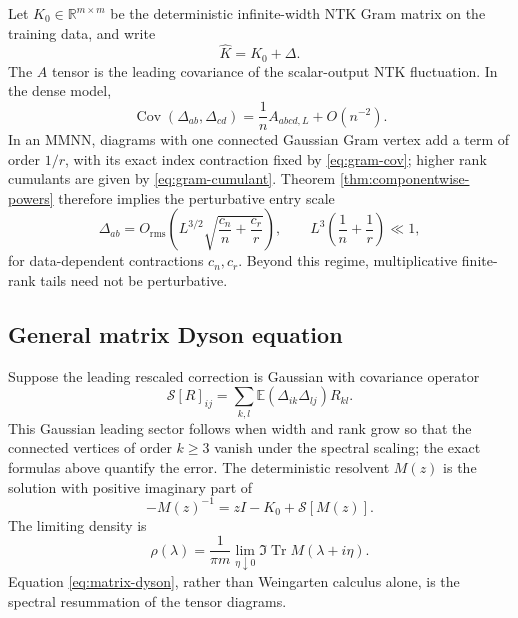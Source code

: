 \documentclass{article}
\newcommand{\E}{\mathbb E}
\newcommand{\R}{\mathbb R}
\newcommand{\Cov}{\operatorname{Cov}}
\newcommand{\Tr}{\operatorname{Tr}}
\begin{document}
Let \(K_0\in\R^{m\times m}\) be the deterministic infinite-width NTK Gram
matrix on the training data, and write
\begin{equation}
\widehat K=K_0+\Delta.
\end{equation}
The \(A\) tensor is the leading covariance of the scalar-output NTK
fluctuation.  In the dense model,
\begin{equation}
\Cov(\Delta_{ab},\Delta_{cd})
=\frac1n A_{abcd,L}+O(n^{-2}).
\label{eq:A-covariance}
\end{equation}
In an MMNN, diagrams with one connected Gaussian Gram vertex add a term of
order \(1/r\), with its exact index contraction fixed by
\eqref{eq:gram-cov}; higher rank cumulants are given by
\eqref{eq:gram-cumulant}.  Theorem \ref{thm:componentwise-powers} therefore
implies the perturbative entry scale
\begin{equation}
\Delta_{ab}=O_{\mathrm{rms}}
\left(L^{3/2}\sqrt{\frac{c_n}{n}+\frac{c_r}{r}}\right),
\qquad L^3\left(\frac1n+\frac1r\right)\ll1,
\label{eq:entry-scale}
\end{equation}
for data-dependent contractions \(c_n,c_r\).  Beyond this regime,
multiplicative finite-rank tails need not be perturbative.

\subsection{General matrix Dyson equation}

Suppose the leading rescaled correction is Gaussian with covariance operator
\begin{equation}
\mathcal S[R]_{ij}
=\sum_{k,l}\E(\Delta_{ik}\Delta_{lj})R_{kl}.
\label{eq:self-energy}
\end{equation}
This Gaussian leading sector follows when width and rank grow so that the
connected vertices of order \(k\ge3\) vanish under the spectral scaling; the
exact formulas above quantify the error.  The deterministic resolvent
\(M(z)\) is the solution with positive imaginary part of
\begin{equation}
-M(z)^{-1}=zI-K_0+\mathcal S[M(z)].
\label{eq:matrix-dyson}
\end{equation}
The limiting density is
\begin{equation}
\rho(\lambda)=\frac1{\pi m}\lim_{\eta\downarrow0}
\Im\Tr M(\lambda+i\eta).
\label{eq:mde-density}
\end{equation}
Equation \eqref{eq:matrix-dyson}, rather than Weingarten calculus alone, is
the spectral resummation of the tensor diagrams.
\end{document}

